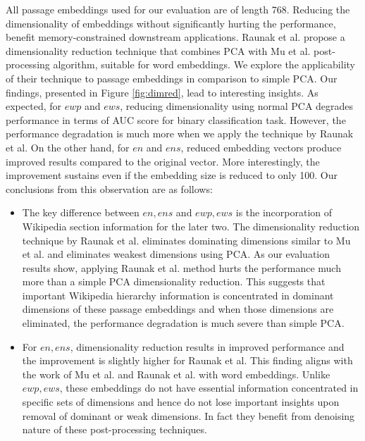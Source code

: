 All passage embeddings used for our evaluation are of length 768. Reducing the dimensionality of embeddings without significantly hurting the performance, benefit memory-constrained downstream applications. Raunak et al. propose a dimensionality reduction technique that combines PCA with Mu et al. post-processing algorithm, suitable for word embeddings. We explore the applicability of their technique to passage embeddings in comparison to simple PCA. Our findings, presented in Figure \ref{fig:dimred}, lead to interesting insights. As expected, for $ewp$ and $ews$, reducing dimensionality using normal PCA degrades performance in terms of AUC score for binary classification task. However, the performance degradation is much more when we apply the technique by Raunak et al. On the other hand, for $en$ and $ens$, reduced embedding vectors produce improved results compared to the original vector. More interestingly, the improvement sustains even if the embedding size is reduced to only 100. Our conclusions from this observation are as follows:
\begin{itemize}
    \item The key difference between $en, ens$ and $ewp, ews$ is the incorporation of Wikipedia section information for the later two. The dimensionality reduction technique by Raunak et al. eliminates dominating dimensions similar to Mu et al. and eliminates weakest dimensions using PCA. As our evaluation results show, applying Raunak et al. method hurts the performance much more than a simple PCA dimensionality reduction. This suggests that important Wikipedia hierarchy information is concentrated in dominant dimensions of these passage embeddings and when those dimensions are eliminated, the performance degradation is much severe than simple PCA.
    \item For $en, ens$, dimensionality reduction results in improved performance and the improvement is slightly higher for Raunak et al. This finding aligns with the work of Mu et al. and Raunak et al. with word embeddings. Unlike $ewp, ews$, these embeddings do not have essential information concentrated in specific sets of dimensions and hence do not lose important insights upon removal of dominant or weak dimensions. In fact they benefit from denoising nature of these post-processing techniques.
\end{itemize}


